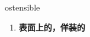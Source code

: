 
\begin{frame}
{\huge ostensible}
\begin{center}
\begin{enumerate}\Large
  \item \textbf{表面上的，佯装的}
\end{enumerate}
\end{center}
\end{frame}
